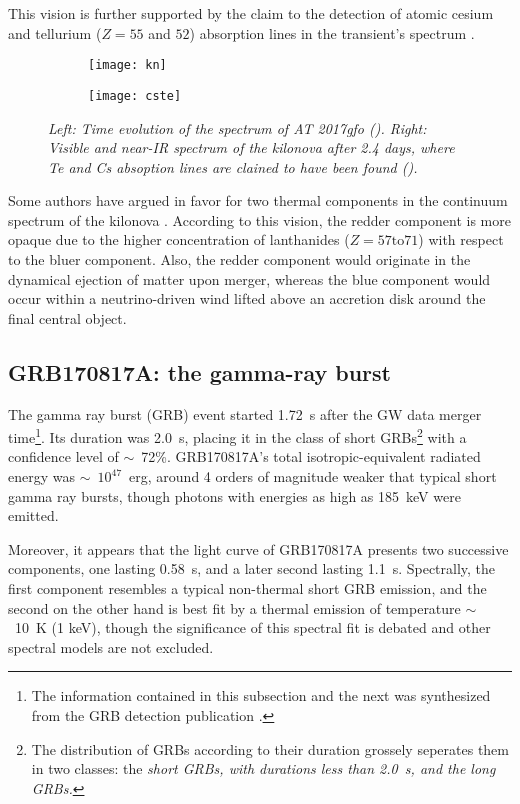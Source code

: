 This vision is further supported by the claim to the detection of atomic cesium and tellurium ($Z = 55$ and $52$) absorption lines in the transient's spectrum \cite{53}.

\begin{figure}
    \centering
    \begin{subfigure}
        \centering
        \texttt{[image: kn]}
    \end{subfigure}
    \begin{subfigure}
        \centering
        \texttt{[image: cste]}
    \end{subfigure}
    \caption{\it{Left:} Time evolution of the spectrum of AT 2017gfo (\cite{38}). \it{Right:} Visible and near-IR spectrum of the kilonova after 2.4 days, where Te and Cs absoption lines are clained to have been found (\cite{53}).}
    \label{kn}
\end{figure}

Some authors have argued in favor for two thermal components in the continuum spectrum of the kilonova \cite{57}. According to this vision, the redder component is more opaque due to the higher concentration of lanthanides ($Z = 57 \text{to} 71$) with respect to the bluer component. Also, the redder component would originate in the dynamical ejection of matter upon merger, whereas the blue component would occur within a neutrino-driven wind lifted above an accretion disk around the final central object.


\subsection{GRB170817A: the gamma-ray burst}
The gamma ray burst (GRB) event started 1.72~s after the GW data merger time\footnote{The information contained in this subsection and the next was synthesized from the GRB detection publication \cite{52}.}. Its duration was 2.0~s, placing it in the class of short GRBs\footnote{The distribution of GRBs according to their duration grossely seperates them in two classes: the \it{short} GRBs, with durations less than 2.0~s, and the \it{long} GRBs.} with a confidence level of $\sim$~72\%. GRB170817A's total isotropic-equivalent radiated energy was $\sim$~$10^{47}$~erg, around 4 orders of magnitude weaker that typical short gamma ray bursts, though photons with energies as high as 185~keV were emitted.

Moreover, it appears that the light curve of GRB170817A presents two successive components, one lasting 0.58~s, and a later second lasting 1.1~s. Spectrally, the first component resembles a typical non-thermal short GRB emission, and the second on the other hand is best fit by a thermal emission of temperature $\sim$~10~K (1 keV), though the significance of this spectral fit is debated and other spectral models are not excluded.

